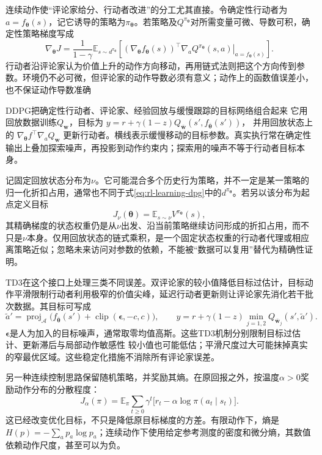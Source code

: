 连续动作使“评论家给分、行动者改进”的分工尤其直接。令确定性行动者为$a=f_{\bm\theta}(s)$，记它诱导的策略为$\pi_{\bm\theta}$。若策略及$Q^{\pi_{\bm\theta}}$对所需变量可微、导数可积，确定性策略梯度写成
\begin{equation}
  \nabla_{\bm\theta}J
    =\frac1{1-\gamma}
       \mathbb E_{s\sim d^{\pi_{\bm\theta}}}
       \left[
         (\nabla_{\bm\theta}f_{\bm\theta}(s))^\top
         \left.\nabla_a Q^{\pi_{\bm\theta}}(s,a)
                    \right|_{a=f_{\bm\theta}(s)}
       \right].
  \label{eq:rl-learning-dpg}
\end{equation}
行动者沿评论家认为价值上升的动作方向移动，再用链式法则把这个方向传到参数。环境仍不必可微，但评论家的动作导数必须有意义；动作上的函数值误差小，也不保证动作导数准确

DDPG把确定性行动者、评论家、经验回放与缓慢跟踪的目标网络组合起来
它用回放数据训练$Q_{\bm w}$，目标为
$y=r+\gamma(1-z)Q_{\bar{\bm w}}(s',f_{\bar{\bm\theta}}(s'))$，
并用回放状态上的
$\nabla_{\bm\theta}f^\top\nabla_a Q_{\bm w}$
更新行动者。横线表示缓慢移动的目标参数。真实执行常在确定性输出上叠加探索噪声，再投影到动作约束内；探索用的噪声不等于行动者目标本身。

记固定回放状态分布为$\nu$。它可能混合多个历史行为策略，并不一定是某一策略的归一化折扣占用，通常也不同于式\eqref{eq:rl-learning-dpg}中的$d^{\pi_{\bm\theta}}$。若另以该分布为起点定义目标
\[
  J_\nu(\bm\theta)=\mathbb E_{s\sim\nu}V^{\pi_{\bm\theta}}(s),
\]
其精确梯度的状态权重仍是从$\nu$出发、沿当前策略继续访问形成的折扣占用，而不只是$\nu$本身。仅用回放状态的链式乘积，是一个固定状态权重的行动者代理或相应离策略近似；忽略未来访问对参数的依赖，不能被“数据可以复用”替代为精确性证明。

TD3在这个接口上处理三类不同误差。双评论家的较小值降低目标过估计，目标动作平滑限制行动者利用极窄的价值尖峰，延迟行动者更新则让评论家先消化若干批次数据。其目标可写成
\[
  \widetilde a'
    =\operatorname{proj}_{\mathcal A}
        \bigl(f_{\bar{\bm\theta}}(s')
              +\operatorname{clip}(\bm\epsilon,-c,c)\bigr),
  \qquad
  y=r+\gamma(1-z)\min_{j=1,2}Q_{\bar{\bm w}_j}(s',\widetilde a').
\]
$\bm\epsilon$是人为加入的目标噪声，通常取零均值高斯。这些TD3机制分别限制目标过估计、更新滞后与局部动作敏感性
较小值也可能低估；平滑尺度过大可能抹掉真实的窄最优区域。这些稳定化措施不消除所有评论家误差。

另一种连续控制思路保留随机策略，并奖励其熵。在原回报之外，按温度$\alpha>0$奖励动作分布的分散程度：
\begin{equation}
  J_\alpha(\pi)=\mathbb E_\pi\sum_{t\geq0}\gamma^t
      \bigl[r_t-\alpha\log\pi(a_t\mid s_t)\bigr].
  \label{eq:rl-learning-maxent-objective}
\end{equation}
这已经改变优化目标，不只是降低原目标梯度的方差。有限动作下，熵是
$H(p)=-\sum_a p_a\log p_a$；连续动作下使用给定参考测度的密度和微分熵，其数值依赖动作尺度，甚至可以为负。

